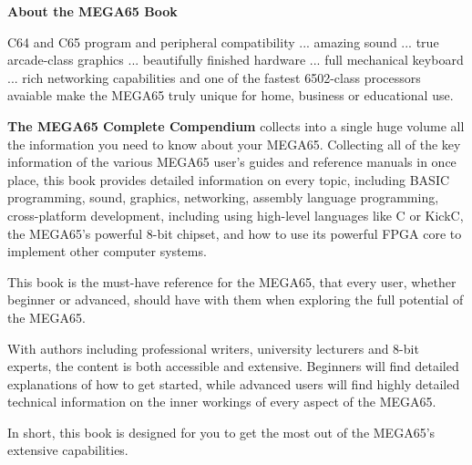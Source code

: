 \begin{center}
\begin{minipage}{.8\textwidth}
\color{white}
\begin{center}
{ \huge\bfseries\sffamily\color{white}About the MEGA65 Book }
\end{center}

\vspace{3mm}
\hrulefill
\vspace{3mm}

{
C64 and C65 program and peripheral compatibility ... amazing sound ... true arcade-class graphics
... beautifully finished hardware ... full mechanical keyboard ... rich networking capabilities
and one of the fastest 6502-class processors avaiable make the MEGA65 truly unique for home, business
or educational use.

\vspace{2mm}

{\bf The MEGA65 Complete Compendium} collects into a single huge volume all the information you need to know about
your MEGA65.  Collecting all of the key information of the various MEGA65 user's guides and reference
manuals in once place, this book provides detailed information on every topic, including BASIC programming,
sound, graphics, networking, assembly language programming, cross-platform development, including using
high-level languages like C or KickC, the MEGA65's powerful 8-bit chipset, and how to use its powerful
FPGA core to implement other computer systems.

\vspace{2mm}

This book is the must-have reference for the MEGA65, that every user, whether beginner or advanced, should
have with them when exploring the full potential of the MEGA65.

\vspace{2mm}

With authors including professional writers, university lecturers and 8-bit experts, the content is
both accessible and extensive.  Beginners will find detailed explanations of how to get started,
while advanced users will find highly detailed technical information on the inner workings of  every
aspect of the MEGA65.

\vspace{2mm}

In short, this book is designed for you to get the most out of the MEGA65's extensive capabilities.
}

\end{minipage}
\end{center}

